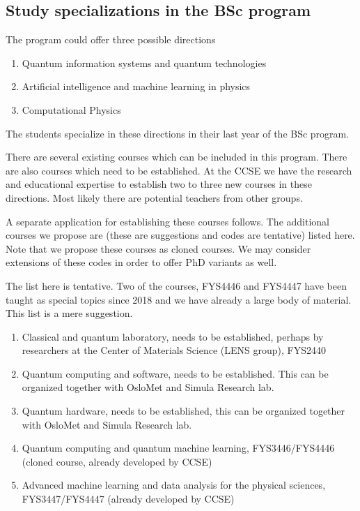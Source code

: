\documentclass[%
oneside,                 %
final,                   %
10pt]{article}
\begin{document}
\subsection{Study specializations in the BSc program}

The program could offer  three possible directions
\begin{enumerate}
\item Quantum information systems and quantum technologies

\item Artificial intelligence and machine learning in physics

\item Computational Physics
\end{enumerate}

\noindent
The students specialize in these directions in their last year of the BSc program.

There are several existing courses which can be included in this
program. There are also courses which need to be established. At the
CCSE we have the research and educational expertise to establish two
to three new courses in these directions. Most likely there are
potential teachers from other groups.

A separate application for establishing these courses follows. The
additional courses we propose are (these are suggestions and codes are
tentative) listed here. Note that we propose these courses as cloned
courses. We may consider extensions of these codes in order to offer
PhD variants as well.

The list here is tentative. Two of the courses, FYS4446 and FYS4447 have been taught as special topics since 2018 and we have already a large body of material.
This list is a mere suggestion.

\begin{enumerate}
\item Classical and quantum laboratory, needs to be established, perhaps by researchers at the Center of Materials Science (LENS group), FYS2440

\item Quantum computing and software, needs to be established. This can be organized together with OsloMet and Simula Research lab.

\item Quantum hardware, needs to be established, this can be organized together with OsloMet and Simula Research lab. 

\item Quantum computing and quantum machine learning, FYS3446/FYS4446 (cloned course, already developed by CCSE)

\item Advanced machine learning and data analysis for the physical sciences, FYS3447/FYS4447 (already developed by CCSE)
\end{enumerate}
\end{document}
